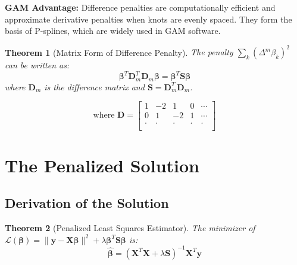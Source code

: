 \documentclass[12pt]{article}
\newtheorem{theorem}{Theorem}
\begin{document}
\textbf{GAM Advantage:} Difference penalties are computationally efficient and approximate derivative penalties when knots are evenly spaced. They form the basis of P-splines, which are widely used in GAM software.

\begin{theorem}[Matrix Form of Difference Penalty]
The penalty $\sum_k (\Delta^m \beta_k)^2$ can be written as:
\begin{equation}
\bm{\beta}^T \mathbf{D}_m^T \mathbf{D}_m \bm{\beta} = \bm{\beta}^T \mathbf{S} \bm{\beta}
\end{equation}
where $\mathbf{D}_m$ is the difference matrix and $\mathbf{S} = \mathbf{D}_m^T \mathbf{D}_m$.
\end{theorem}

$$
\text{where } \mathbf{D} = \begin{bmatrix}
1 & -2 & 1 & 0 & \cdots \\
0 & 1 & -2 & 1 & \cdots \\
\cdot & \cdot & \cdot & \cdot & \cdot \\
\end{bmatrix}
$$



\section{The Penalized Solution}

\subsection{Derivation of the Solution}

\begin{theorem}[Penalized Least Squares Estimator]
The minimizer of $\mathcal{L}(\bm{\beta}) = \|\mathbf{y} - \mathbf{X}\bm{\beta}\|^2 + \lambda \bm{\beta}^T \mathbf{S} \bm{\beta}$ is:
\begin{equation}
\hat{\bm{\beta}} = (\mathbf{X}^T\mathbf{X} + \lambda\mathbf{S})^{-1}\mathbf{X}^T\mathbf{y}
\end{equation}
\end{theorem}
\end{document}
